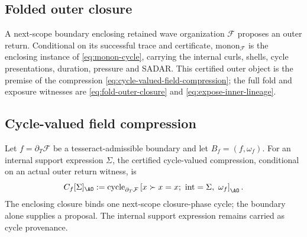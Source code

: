 \subsection{Folded outer closure}
\label{subsec:field-as-monon-compression}
A next-scope boundary enclosing retained wave organization \(\mathcal F\)
proposes an outer return. Conditional on its successful trace and certificate,
\(\mathrm{monon}_{\mathcal F}\) is the enclosing instance of
\eqref{eq:monon-cycle}, carrying the internal curls, shells, cycle presentations,
duration, pressure and SADAR. This certified outer object is the premise of the
compression \eqref{eq:cycle-valued-field-compression}; the full fold and exposure
witnesses are \eqref{eq:fold-outer-closure} and \eqref{eq:expose-inner-lineage}.


\subsection{Cycle-valued field compression}
\label{subsec:cycle-valued-field-compression}
\begin{definition}
Let \(f=\partial_T\mathcal F\) be a tesseract-admissible boundary and let \(B_f=(f,\omega_f)\). For an internal support expression \(\Sigma\), the certified cycle-valued compression, conditional on an actual outer return witness, is
\begin{equation}
C_f[\Sigma]_{\AO}
:=
\operatorname{cycle}_{\partial_T\mathcal F}
\left[
  x\succ x=x;\ \operatorname{int}=\Sigma,\ \omega_f
\right]_{\AO}.
\label{eq:cycle-valued-field-compression}
\end{equation}
The enclosing closure binds one next-scope closure-phase cycle; the boundary alone supplies a proposal. The internal support expression remains carried as cycle provenance.
\end{definition}


